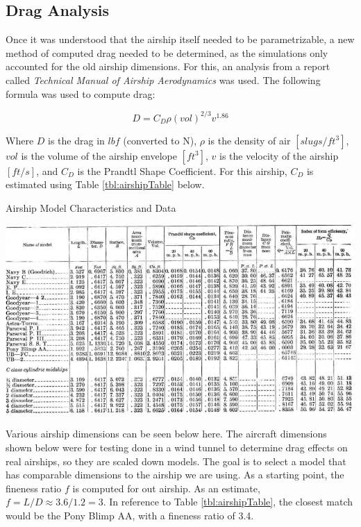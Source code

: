 \documentclass[../main.tex]{subfiles}
\begin{document}
\subsection{Drag Analysis}

Once it was understood that the airship itself needed to be parametrizable, a new method of computed drag needed to be determined, as the simulations only accounted for the old airship dimensions. For this, an analysis from a report called \textit{Technical Manual of Airship Aerodynamics} \cite{airshipAerodynamics} was used. The following formula was used to compute drag:

\begin{equation}
		D = C_D\rho (vol)^{2/3}v^{1.86}
\end{equation}

Where $D$ is the drag in $lbf$ (converted to N), $ \rho $ is the density of air $[slugs/ft^3]$, $vol$ is the volume of the airship envelope $[ft^3]$, $v$ is the velocity of the airship $[ft/s]$, and $C_D$ is the Prandtl Shape Coefficient. For this airship, $C_D$ is estimated using Table \ref{tbl:airshipTable} below.

\begin{table}[H]
	\centering
	\caption{Airship Model Characteristics and Data \cite{airshipAerodynamics}}
	\includegraphics[width=\linewidth]{img/drag/airships.PNG}
	\label{tbl:airshipTable}
\end{table}

Various airship dimensions can be seen below here. The aircraft dimensions shown below were for testing done in a wind tunnel to determine drag effects on real airships, so they are scaled down models. The goal is to select a model that has comparable dimensions to the airship we are using. As a starting point, the fineness ratio $f$ is computed for out airship. As an estimate, $f=L/D \approx 3.6/1.2 = 3$. In reference to Table \ref{tbl:airshipTable}, the closest match would be the Pony Blimp AA, with a fineness ratio of 3.4.\\
\end{document}
